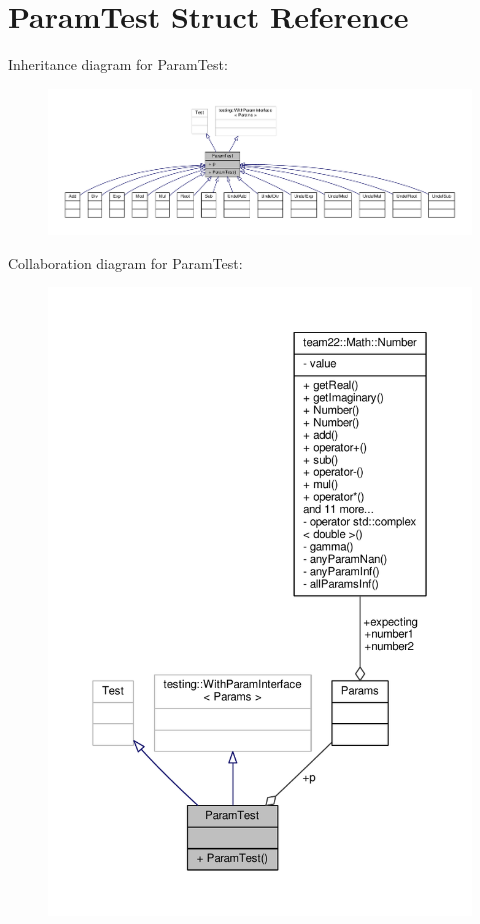 \hypertarget{struct_param_test}{}\section{Param\+Test Struct Reference}
\label{struct_param_test}


Inheritance diagram for Param\+Test\+:
\nopagebreak
\begin{figure}[H]
\begin{center}
\leavevmode
\includegraphics[width=350pt]{struct_param_test__inherit__graph}
\end{center}
\end{figure}


Collaboration diagram for Param\+Test\+:
\nopagebreak
\begin{figure}[H]
\begin{center}
\leavevmode
\includegraphics[width=350pt]{struct_param_test__coll__graph}
\end{center}
\end{figure}
